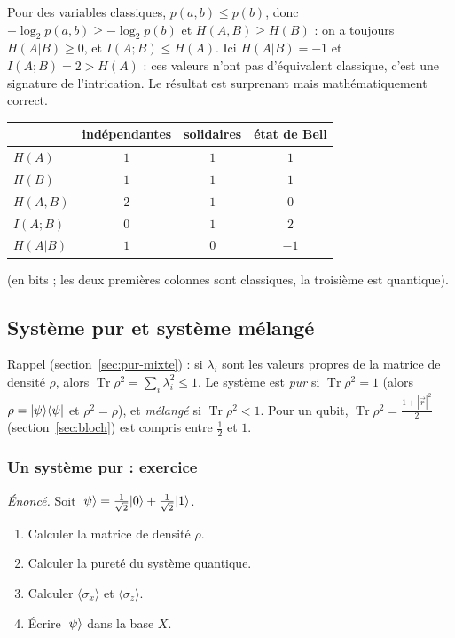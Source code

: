 \begin{remarque}
Pour des variables classiques, $p(a,b)\leq p(b)$, donc $-\log_2p(a,b)\geq-\log_2p(b)$ et
$H(A,B)\geq H(B)$ : on a toujours $H(A|B)\geq0$, et $I(A;B)\leq H(A)$. Ici $H(A|B)=-1$ et
$I(A;B)=2>H(A)$ : ces valeurs n'ont pas d'équivalent classique, c'est une signature de
l'intrication. Le résultat est surprenant mais mathématiquement correct.
\end{remarque}

\begin{center}
\renewcommand{\arraystretch}{1.4}
\begin{tabular}{@{}lccc@{}}
\toprule
 & indépendantes & solidaires & état de Bell \\
\midrule
$H(A)$ & $1$ & $1$ & $1$ \\
$H(B)$ & $1$ & $1$ & $1$ \\
$H(A,B)$ & $2$ & $1$ & $0$ \\
$I(A;B)$ & $0$ & $1$ & $2$ \\
$H(A|B)$ & $1$ & $0$ & $-1$ \\
\bottomrule
\end{tabular}
\end{center}
(en bits ; les deux premières colonnes sont classiques, la troisième est quantique).

\subsection{Système pur et système mélangé}\label{sec:pur-melange}

Rappel (section~\ref{sec:pur-mixte}) : si $\lambda_i$ sont les valeurs propres de la matrice de
densité $\rho$, alors $\operatorname{Tr}\rho^2=\sum_i\lambda_i^2\leq1$. Le système est
\emph{pur} si $\operatorname{Tr}\rho^2=1$ (alors $\rho=|\psi\rangle\langle \psi|$ et $\rho^2=\rho$),
et \emph{mélangé} si $\operatorname{Tr}\rho^2<1$. Pour un qubit,
$\operatorname{Tr}\rho^2=\frac{1+|\vec r|^2}{2}$ (section~\ref{sec:bloch}) est compris entre
$\frac12$ et $1$.

\subsubsection{Un système pur : exercice}

\emph{Énoncé.} Soit $|\psi\rangle=\frac{1}{\sqrt2}|0\rangle+\frac{1}{\sqrt2}|1\rangle$.
\begin{enumerate}[label=\alph*), nosep]
  \item Calculer la matrice de densité $\rho$.
  \item Calculer la pureté du système quantique.
  \item Calculer $\langle\sigma_x\rangle$ et $\langle\sigma_z\rangle$.
  \item Écrire $|\psi\rangle$ dans la base $X$.
\end{enumerate}

